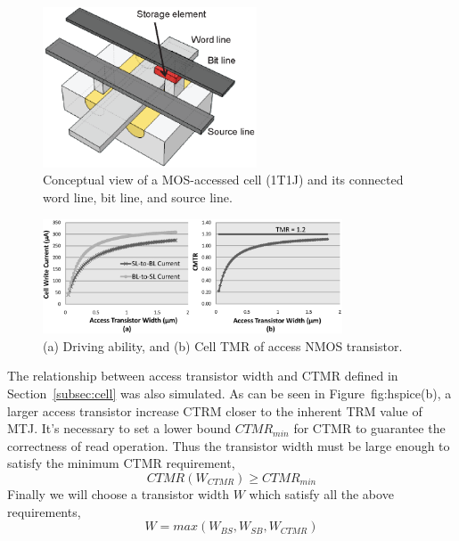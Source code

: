 \begin{figure}[t]
  \centering
  \includegraphics[width=2.5in]{fig/1t1r.eps}
  \vspace{-10pt}
  \caption{Conceptual view of a MOS-accessed cell (1T1J) and its connected word line, bit line, and source line.}
  \label{fig:1t1r}
  \vspace{-5pt}
\end{figure}

\begin{figure}[t]
  \centering
  \includegraphics[width=3.5in]{fig/HSPICE.eps}
  \caption{(a) Driving ability, and (b) Cell TMR of access NMOS transistor.}
  \label{fig:hspice}
  \vspace{-15pt}
\end{figure}

The relationship between access transistor width and CTMR defined in Section~\ref{subsec:cell} was also simulated. As can be seen in Figure~{fig:hspice}(b), a larger access transistor increase CTRM closer to the inherent TRM value of MTJ. It's necessary to set a lower bound $CTMR_{min}$ for CTMR to guarantee the correctness of read operation. Thus the transistor width must be large enough to satisfy the minimum CTMR requirement,
\begin{equation}
CTMR(W_{CTMR}) \geq CTMR_{min}
\end{equation}
Finally we will choose a transistor width $W$ which satisfy all the above requirements,
\begin{equation}
W = max(W_{BS}, W_{SB}, W_{CTMR}) \label{equ:width}
\end{equation}

